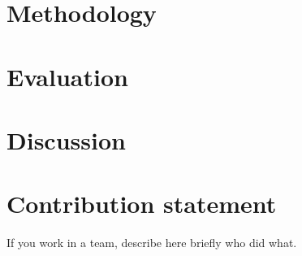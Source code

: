 \documentclass[11pt]{article}
\begin{document}
\section{Methodology}

\section{Evaluation}

\section{Discussion}


\section{Contribution statement}

If you work in a team, describe here briefly who did what.


% 
\end{document}
